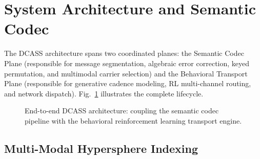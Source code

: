 \documentclass[11pt,journal,onecolumn]{IEEEtran}\linespread{1.3}
\begin{document}
\section{System Architecture and Semantic Codec}

The DCASS architecture spans two coordinated planes: the Semantic Codec Plane (responsible for message segmentation, algebraic error correction, keyed permutation, and multimodal carrier selection) and the Behavioral Transport Plane (responsible for generative cadence modeling, RL multi-channel routing, and network dispatch). Fig.~\ref{fig:arch} illustrates the complete lifecycle.

\begin{figure}[t]
\centering
{}
\caption{End-to-end DCASS architecture: coupling the semantic codec pipeline with the behavioral reinforcement learning transport engine.}
\label{fig:arch}
\end{figure}

\subsection{Multi-Modal Hypersphere Indexing}
\end{document}

